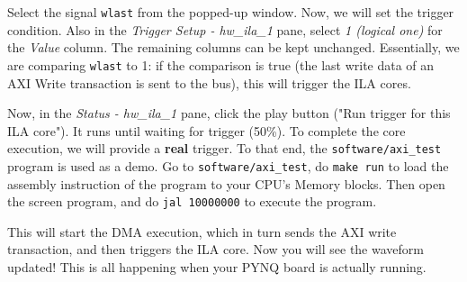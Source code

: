 \documentclass[11pt]{article}
\begin{document}
Select the signal \verb|wlast| from the popped-up window. Now, we will set the trigger condition. Also in the \emph{Trigger Setup - hw\_ila\_1} pane, select \emph{1 (logical one)} for the \emph{Value} column. The remaining columns can be kept unchanged. Essentially, we are comparing \verb|wlast| to 1: if the comparison is true (the last write data of an AXI Write transaction is sent to the bus), this will trigger the ILA cores.

\begin{center}
\end{center}

Now, in the \emph{Status - hw\_ila\_1} pane, click the play button ("Run trigger for this ILA core"). It runs until waiting for trigger (50\%). To complete the core execution, we will provide a \textbf{real} trigger. To that end, the \verb|software/axi_test| program is used as a demo. Go to \verb|software/axi_test|, do \texttt{make run} to load the assembly instruction of the program to your CPU's Memory blocks. Then open the screen program, and do \texttt{jal 10000000} to execute the program.

\begin{center}
\end{center}

This will start the DMA execution, which in turn sends the AXI write transaction, and then triggers the ILA core. Now you will see the waveform updated! This is all happening when your PYNQ board is actually running.
\end{document}
